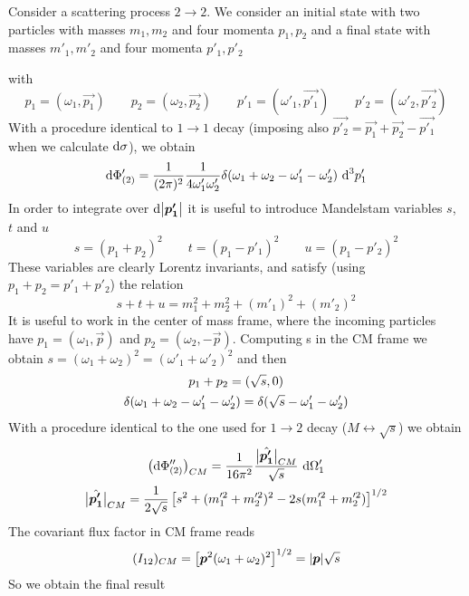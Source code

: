\documentclass[TheoreticalPhy_ModB.tex]{subfiles}
\begin{document}
\begin{example}[$2 \to 2$ scattering]
Consider a scattering process $2 \to 2$. We consider an initial state with two particles with masses $m_1, m_2$ and four momenta $p_1, p_2$ and a final state with masses $m'_1, m'_2$ and four momenta $p'_1, p'_2$

\begin{center}

\end{center}
%
with
\[
p_1 = (\omega_1, \vec{p_1}) \qquad
p_2 = (\omega_2, \vec{p_2}) \qquad
p'_1 = (\omega'_1, \vec{p'_1}) \qquad
p'_2 = (\omega'_2, \vec{p'_2})
\]
With a procedure identical to $1 \to 1$ decay (imposing also $\vec{p'_2} = \vec{p_1} + \vec{p_2} - \vec{p'_1}$ when we calculate $\textup{d} \sigma$), we obtain 
\[
\textup{d} \Phi'_{(2)} = \frac{1}{(2 \pi)^2} \frac{1}{4 \omega'_1 \omega'_2} \delta (\omega_1 + \omega_2 - \omega'_1 - \omega'_2) \ \textup{d}^3p'_1
\]
In order to integrate over $\textup{d} \abs{\boldsymbol{p'_1}}$ it is useful to introduce Mandelstam variables $s$, $t$ and $u$
\[
s = (p_1 + p_2)^2 \qquad
t = (p_1 - p'_1)^2 \qquad
u = (p_1 - p'_2)^2
\]
These variables are clearly Lorentz invariants, and satisfy (using $p_1 + p_2 = p'_1 + p'_2$) the relation
\[
s + t + u = m_1^2 + m_2^2 + (m'_1)^2 + (m'_2)^2
\]
It is useful to work in the center of mass frame, where the incoming particles have $p_1 = (\omega_1, \vec{p})$ and $p_2 = (\omega_2, -\vec{p})$. Computing s in the CM frame we obtain $s = (\omega_1 + \omega_2)^2 = (\omega'_1 + \omega'_2)^2$ and then
\begin{gather}
p_1 + p_2 = (\sqrt{s}, 0) \notag \\
\delta(\omega_1 + \omega_2 - \omega'_1 -\omega'_2) = \delta (\sqrt{s} - \omega'_1 - \omega'_2) \notag
\end{gather}
With a procedure identical to the one used for $1 \to 2$ decay ($M \leftrightarrow \sqrt{s}$) we obtain
\begin{gather}
\bigl( \textup{d} \Phi''_{(2)} \bigr)_{CM} = \frac{1}{16 \pi^2} \frac{\big\vert{\hat{\boldsymbol{p'_1}}}\big\vert_{CM}}{\sqrt{s}} \ \textup{d} \Omega'_1 \notag \\
\big\vert{\hat{\boldsymbol{p'_1}}}\big\vert_{CM} = \frac{1}{2 \sqrt{s}} \left[ s^2 + (m^{\prime 2}_1 + m^{\prime 2}_2)^2 - 2s (m^{\prime 2}_1 + m^{\prime 2}_2) \right]^{1/2} \notag
\end{gather}
The covariant flux factor in CM frame reads
\[
(I_{12})_{CM} = \left[ \boldsymbol{p}^2 (\omega_1 + \omega_2 )^2 \right]^{1/2} = \abs{\boldsymbol{p}} \sqrt{s}
\]
So we obtain the final result
\[
\begin{split}

\end{split}\]
\end{example}
\end{document}
